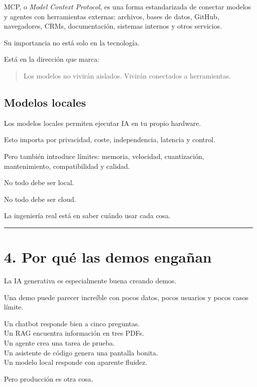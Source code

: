 MCP, o \emph{Model Context Protocol}, es una forma estandarizada de
conectar modelos y agentes con herramientas externas: archivos, bases de
datos, GitHub, navegadores, CRMs, documentación, sistemas internos y
otros servicios.

Su importancia no está solo en la tecnología.

Está en la dirección que marca:

\begin{quote}
Los modelos no vivirán aislados. Vivirán conectados a herramientas.
\end{quote}

\subsection{Modelos locales}\label{modelos-locales}

Los modelos locales permiten ejecutar IA en tu propio hardware.

Esto importa por privacidad, coste, independencia, latencia y control.

Pero también introduce límites: memoria, velocidad, cuantización,
mantenimiento, compatibilidad y calidad.

No todo debe ser local.

No todo debe ser cloud.

La ingeniería real está en saber cuándo usar cada cosa.

\begin{center}\rule{0.5\linewidth}{0.5pt}\end{center}

\section{4. Por qué las demos
engañan}\label{por-quuxe9-las-demos-engauxf1an}

La IA generativa es especialmente buena creando demos.

Una demo puede parecer increíble con pocos datos, pocos usuarios y pocos
casos límite.

Un chatbot responde bien a cinco preguntas.\\
Un RAG encuentra información en tres PDFs.\\
Un agente crea una tarea de prueba.\\
Un asistente de código genera una pantalla bonita.\\
Un modelo local responde con aparente fluidez.

Pero producción es otra cosa.

